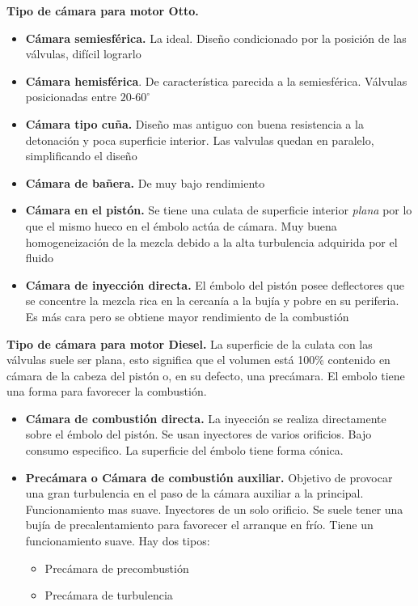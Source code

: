 \textbf{Tipo de cámara para motor Otto.} 
\begin{itemize}
\item \textbf{Cámara semiesférica.} La ideal. Diseño condicionado por la posición de las válvulas, difícil lograrlo
\item \textbf{Cámara hemisférica}. De característica parecida a la semiesférica. Válvulas posicionadas entre $20$-$60^\circ$
\item \textbf{Cámara tipo cuña.} Diseño mas antiguo con buena resistencia a la detonación y poca superficie interior. Las valvulas quedan en paralelo, simplificando el diseño
\item \textbf{Cámara de bañera.} De muy bajo rendimiento
\item \textbf{Cámara en el pistón.}  Se tiene una culata de superficie interior \textit{plana} por lo que el mismo hueco en el émbolo actúa de cámara. Muy buena homogeneización de la mezcla debido a la alta turbulencia adquirida por el fluido
\item \textbf{Cámara de inyección directa.} El émbolo del pistón posee deflectores que se concentre la mezcla rica en la cercanía a la bujía y pobre en su periferia. Es más cara pero se obtiene mayor rendimiento de la combustión
\end{itemize}

\textbf{Tipo de cámara para motor Diesel.} La superficie de la culata con las válvulas suele ser plana, esto significa que el volumen está 100\% contenido en cámara de la cabeza del pistón o, en su defecto, una precámara. El embolo tiene una forma para favorecer la combustión.
\begin{itemize}
\item \textbf{Cámara de combustión directa.} La inyección se realiza directamente sobre el émbolo del pistón. Se usan inyectores de varios orificios. Bajo consumo especifico. La superficie del émbolo tiene forma cónica.
\item \textbf{Precámara o Cámara de combustión auxiliar.} Objetivo de provocar una gran turbulencia en el paso de la cámara auxiliar a la principal. Funcionamiento mas suave. Inyectores de un solo orificio. Se suele tener una bujía de precalentamiento para favorecer el arranque en frío. Tiene un funcionamiento suave. Hay dos tipos:
\begin{itemize}
\item Precámara de precombustión
\item Precámara de turbulencia
\end{itemize}
\end{itemize}

